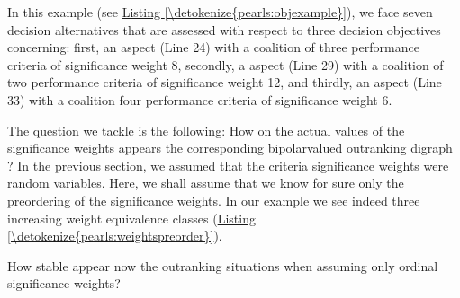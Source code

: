 \documentclass[a4paper,12pt,english]{sphinxhowto}
\begin{document}
\sphinxAtStartPar
In this example (see \hyperref[\detokenize{pearls:objexample}]{Listing \ref{\detokenize{pearls:objexample}}}), we face seven decision alternatives that are assessed with respect to three  decision objectives concerning: first, an  aspect (Line 24) with a coalition of three performance criteria of significance weight 8, secondly, a  aspect (Line 29) with a coalition of two performance criteria of significance weight 12, and thirdly, an  aspect (Line 33) with a coalition four performance criteria of significance weight 6.

\sphinxAtStartPar
The question we tackle is the following: How  on the actual values of the significance weights appears the corresponding bipolar\sphinxhyphen{}valued outranking digraph ? In the previous section, we assumed that the criteria significance weights were random variables. Here, we shall assume that we know for sure only the preordering of the significance weights. In our example we see indeed three increasing weight equivalence classes (\hyperref[\detokenize{pearls:weightspreorder}]{Listing \ref{\detokenize{pearls:weightspreorder}}}).
\def\sphinxLiteralBlockLabel{\label{\detokenize{pearls:weightspreorder}}}
\begin{sphinxVerbatim}[commandchars=\\\{\},numbers=left,firstnumber=1,stepnumber=1]
\end{sphinxVerbatim}

\sphinxAtStartPar
How stable appear now the outranking situations when assuming only ordinal significance weights?
\end{document}
